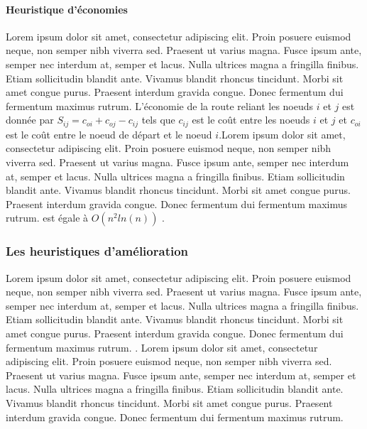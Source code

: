 \paragraph{Heuristique d'économies}
Lorem ipsum dolor sit amet, consectetur adipiscing elit. Proin posuere euismod neque, non semper nibh viverra sed. Praesent ut varius magna. Fusce ipsum ante, semper nec interdum at, semper et lacus. Nulla ultrices magna a fringilla finibus. Etiam sollicitudin blandit ante. Vivamus blandit rhoncus tincidunt. Morbi sit amet congue purus. Praesent interdum gravida congue. Donec fermentum dui fermentum maximus rutrum. L'économie de la route reliant les noeuds $i$ et $j$ est donnée par $S_{ij} = c_{oi} + c_{oj} - c_{ij}$ tels que $c_{ij}$ est le coût entre les noeuds $i$ et $j$ et $c_{oi}$ est le coût entre le noeud de départ et le noeud $i$.Lorem ipsum dolor sit amet, consectetur adipiscing elit. Proin posuere euismod neque, non semper nibh viverra sed. Praesent ut varius magna. Fusce ipsum ante, semper nec interdum at, semper et lacus. Nulla ultrices magna a fringilla finibus. Etiam sollicitudin blandit ante. Vivamus blandit rhoncus tincidunt. Morbi sit amet congue purus. Praesent interdum gravida congue. Donec fermentum dui fermentum maximus rutrum. est égale à $O(n^2ln(n))$ \parencite{golden_approximate_1980}.

\medskip

\subsubsection{Les heuristiques d'amélioration}
Lorem ipsum dolor sit amet, consectetur adipiscing elit. Proin posuere euismod neque, non semper nibh viverra sed. Praesent ut varius magna. Fusce ipsum ante, semper nec interdum at, semper et lacus. Nulla ultrices magna a fringilla finibus. Etiam sollicitudin blandit ante. Vivamus blandit rhoncus tincidunt. Morbi sit amet congue purus. Praesent interdum gravida congue. Donec fermentum dui fermentum maximus rutrum. \parencite{anbuudayasankar_survey_2014}. Lorem ipsum dolor sit amet, consectetur adipiscing elit. Proin posuere euismod neque, non semper nibh viverra sed. Praesent ut varius magna. Fusce ipsum ante, semper nec interdum at, semper et lacus. Nulla ultrices magna a fringilla finibus. Etiam sollicitudin blandit ante. Vivamus blandit rhoncus tincidunt. Morbi sit amet congue purus. Praesent interdum gravida congue. Donec fermentum dui fermentum maximus rutrum.

